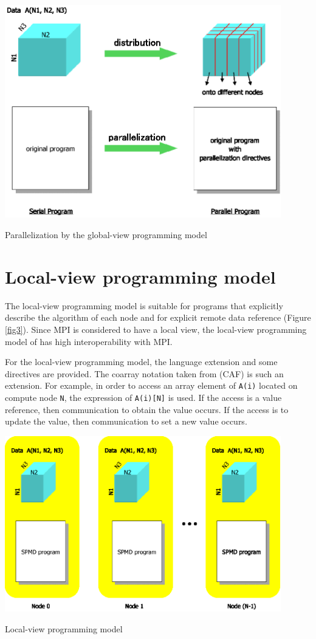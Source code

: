 \begin{myfigure}
\includegraphics[width=12cm]{figs/Fig2.eps}
  \caption{Parallelization by the global-view programming model}
\label{fig2}
\end{myfigure}

\section{Local-view programming model}

The local-view programming model is suitable for 
programs that explicitly describe the algorithm of each node and for explicit
remote data reference (Figure \ref{fig3}). Since MPI is
considered to have a local view, the local-view programming model of \XMP has high
interoperability with MPI.

For the local-view programming model,
the language extension and some directives are provided. The coarray
notation taken from \CAF (CAF) is such an extension. For
example, in order to access an array element of {\tt A(i)} located on compute
node {\tt N},
the expression of {\tt A(i)[N]} is used. If the access is a value reference,
then communication to obtain the value occurs. If the access is to 
update the value, then communication to set a new value occurs.

\begin{myfigure}
\includegraphics[width=12cm]{figs/Fig3.eps}
  \caption{Local-view programming model}
\label{fig3}
\end{myfigure}

